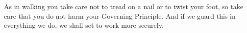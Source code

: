 As in walking  you take care not to tread  on a nail or to twist  your foot, so
take care that you  do not harm your Governing Principle. And  if we guard this
in everything we do, we shall set to work more securely.

